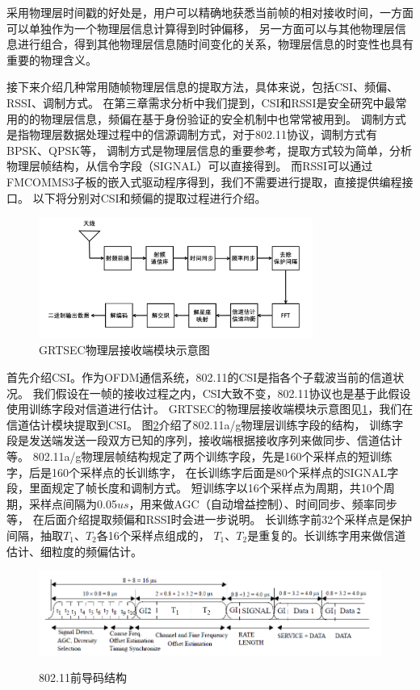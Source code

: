 	采用物理层时间戳的好处是，用户可以精确地获悉当前帧的相对接收时间，一方面可以单独作为一个物理层信息计算得到时钟偏移\cite{tmc10clock}，
	另一方面可以与其他物理层信息进行组合，得到其他物理层信息随时间变化的关系，物理层信息的时变性也具有重要的物理含义。

	接下来介绍几种常用随帧物理层信息的提取方法，具体来说，包括CSI、频偏、RSSI、调制方式。
	在第三章需求分析中我们提到，CSI和RSSI是安全研究中最常用的的物理层信息，频偏在基于身份验证的安全机制中也常常被用到。
	调制方式是指物理层数据处理过程中的信源调制方式，对于802.11协议，调制方式有BPSK、QPSK等，
	调制方式是物理层信息的重要参考，提取方式较为简单，分析物理层帧结构，从信令字段（SIGNAL）可以直接得到。
	而RSSI可以通过FMCOMMS3子板的嵌入式驱动程序得到，我们不需要进行提取，直接提供编程接口。
	以下将分别对CSI和频偏的提取过程进行介绍。

		\begin{figure}
			\centering
			\includegraphics[width=0.8\textwidth]{img/GRT_phy_rx.png}
			\caption{GRTSEC物理层接收端模块示意图}
			\label{fig:GRT_phy_rx}
		\end{figure}

	首先介绍CSI。作为OFDM通信系统，802.11的CSI是指各个子载波当前的信道状况。
	我们假设在一帧的接收过程之内，CSI大致不变，802.11协议也是基于此假设使用训练字段对信道进行估计。
	GRTSEC的物理层接收端模块示意图见\ref{fig:GRT_phy_rx}，我们在信道估计模块提取到CSI。
	图\ref{fig:80211_spec_preamble}介绍了802.11a/g物理层训练字段的结构，
	训练字段是发送端发送一段双方已知的序列，接收端根据接收序列来做同步、信道估计等。
	802.11a/g物理层帧结构规定了两个训练字段，先是160个采样点的短训练字，后是160个采样点的长训练字，
	在长训练字后面是80个采样点的SIGNAL字段，里面规定了帧长度和调制方式。
	短训练字以16个采样点为周期，共10个周期，采样点间隔为0.05$us$，用来做AGC（自动增益控制）、时间同步、频率同步等，
	在后面介绍提取频偏和RSSI时会进一步说明。
	长训练字前32个采样点是保护间隔，抽取$T_1$、$T_2$各16个采样点组成的，
	$T_1$、$T_2$是重复的。长训练字用来做信道估计、细粒度的频偏估计。
		\begin{figure}
			\centering
			\includegraphics[width=1.0\textwidth]{img/80211_spec_preamble.png}
			\caption{802.11前导码结构}
			\label{fig:80211_spec_preamble}
			\cite{ieee80211}
		\end{figure}

